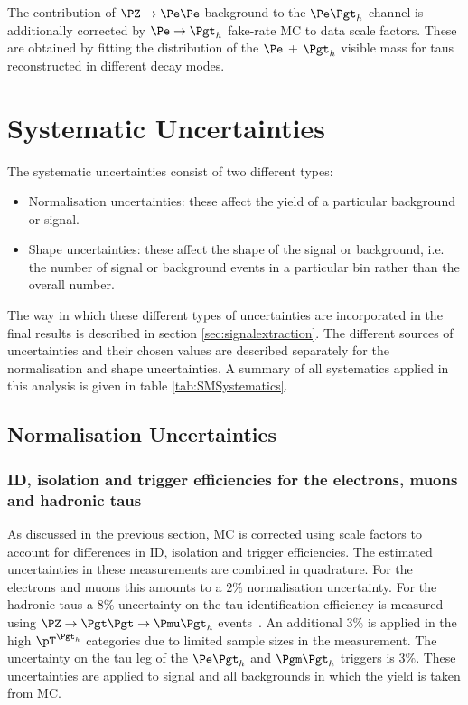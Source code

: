 The contribution of $\PZ \to \Pe\Pe$ background to the $\etau$ channel
is additionally corrected by $\Pe \to \Pgth$ fake-rate \ac{MC} to data
scale factors. These are obtained by fitting the distribution of the $\Pe$ +
$\Pgth$ visible mass for taus reconstructed in different decay modes. 

\section{Systematic Uncertainties}
\label{sec:systematics}

The systematic uncertainties consist of two different types:

\begin{itemize} 
\item Normalisation uncertainties: these affect the yield of a particular background or
signal.
\item Shape uncertainties: these affect the shape of the signal or background,
i.e. the number of signal or background events in a particular bin rather
than the overall number.
\end{itemize}

The way in which these different types of uncertainties are incorporated in the
final results is described in section \ref{sec:signalextraction}. The different
sources of uncertainties and their chosen values are described separately for the 
normalisation and shape uncertainties. A summary of all systematics applied in
this analysis is given in table \ref{tab:SMSystematics}.

\subsection{Normalisation Uncertainties}
\label{sec:systematicUncertainties_yield}

\subsubsection{\textbf{ID, isolation and trigger efficiencies for the electrons, muons and
hadronic taus}}
As discussed in the previous section, \ac{MC} is corrected using scale factors
to account for differences in ID, isolation and trigger efficiencies. The
estimated uncertainties in these measurements are combined in quadrature. 
For the electrons and muons this amounts to a $2\%$ normalisation uncertainty.
For the hadronic taus a $8\%$ uncertainty on the tau identification efficiency
is measured using $\PZ \to \Pgt\Pgt \to \Pmu\Pgth$
events~\cite{Chatrchyan:2012zz}. An additional 3\% is applied in the high
$\pT^{\Pgth}$ categories due to limited sample sizes in the measurement. 
The uncertainty on the tau leg of the $\etau$ and $\mutau$ triggers is $3\%$.
These uncertainties are applied to signal and all backgrounds in which the yield
is taken from \ac{MC}.

